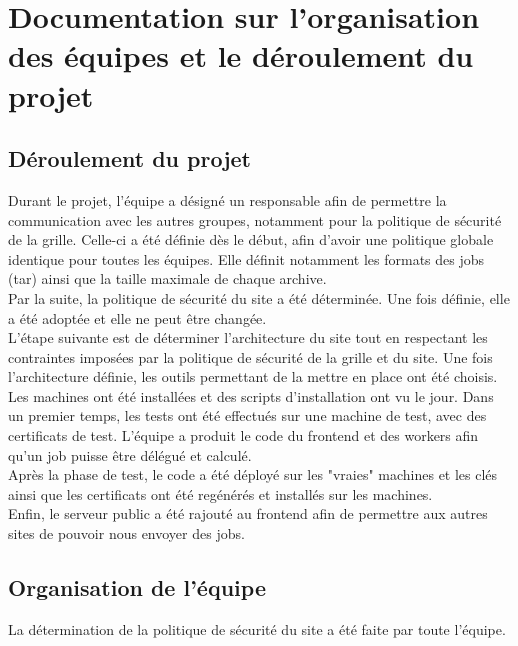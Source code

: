 \newpage

\chapter{Documentation sur l'organisation des équipes et le déroulement du projet}

\section{Déroulement du projet}

Durant le projet, l'équipe a désigné un responsable afin de permettre la communication avec les autres groupes, notamment pour la politique de sécurité de la grille. Celle-ci a été définie dès le début, afin d'avoir une politique globale identique pour toutes les équipes. Elle définit notamment les formats des jobs (tar) ainsi que la taille maximale de chaque archive. \\

Par la suite, la politique de sécurité du site a été déterminée. Une fois définie, elle a été adoptée et elle ne peut être changée. \\

L'étape suivante est de déterminer l'architecture du site tout en respectant les contraintes imposées par la politique de sécurité de la grille et du site. Une fois l'architecture définie, les outils permettant de la mettre en place ont été choisis. \\

Les machines ont été installées et des scripts d'installation ont vu le jour. Dans un premier temps, les tests ont été effectués sur une machine de test, avec des certificats de test. L'équipe a produit le code du frontend et des workers afin qu'un job puisse être délégué et calculé. \\

Après la phase de test, le code a été déployé sur les "vraies" machines et les clés ainsi que les certificats ont été regénérés et installés sur les machines. \\

Enfin, le serveur public a été rajouté au frontend afin de permettre aux autres sites de pouvoir nous envoyer des jobs.

\section{Organisation de l'équipe}

La détermination de la politique de sécurité du site a été faite par toute l'équipe. \\

